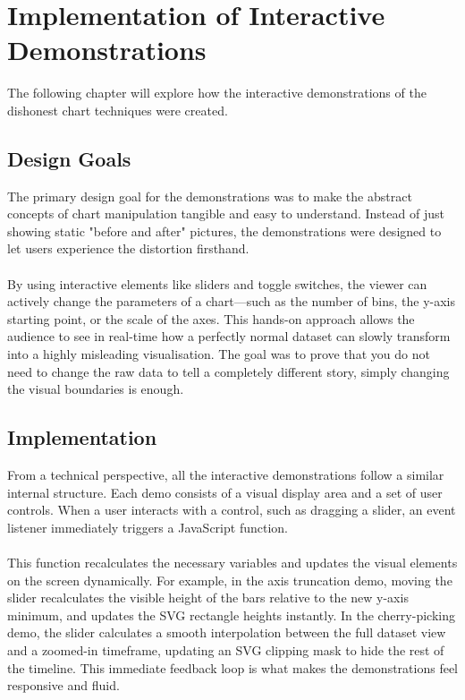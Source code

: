 %
%
% 
% 
% 
% 


\chapter{Implementation of Interactive Demonstrations}
\label{chap:Presentation}

The following chapter will explore how the interactive demonstrations of the dishonest chart techniques were created.

\section{Design Goals}
The primary design goal for the demonstrations was to make the abstract concepts of chart manipulation tangible and easy to understand. Instead of just showing static "before and after" pictures, the demonstrations were designed to let users experience the distortion firsthand. 
\\\\
By using interactive elements like sliders and toggle switches, the viewer can actively change the parameters of a chart—such as the number of bins, the y-axis starting point, or the scale of the axes. This hands-on approach allows the audience to see in real-time how a perfectly normal dataset can slowly transform into a highly misleading visualisation. The goal was to prove that you do not need to change the raw data to tell a completely different story, simply changing the visual boundaries is enough.

\section{Implementation}
From a technical perspective, all the interactive demonstrations follow a similar internal structure. Each demo consists of a visual display area and a set of user controls. When a user interacts with a control, such as dragging a slider, an event listener immediately triggers a JavaScript function. 
\\\\
This function recalculates the necessary variables and updates the visual elements on the screen dynamically. For example, in the axis truncation demo, moving the slider recalculates the visible height of the bars relative to the new y-axis minimum, and updates the SVG rectangle heights instantly. In the cherry-picking demo, the slider calculates a smooth interpolation between the full dataset view and a zoomed-in timeframe, updating an SVG clipping mask to hide the rest of the timeline. This immediate feedback loop is what makes the demonstrations feel responsive and fluid.
\newpage
